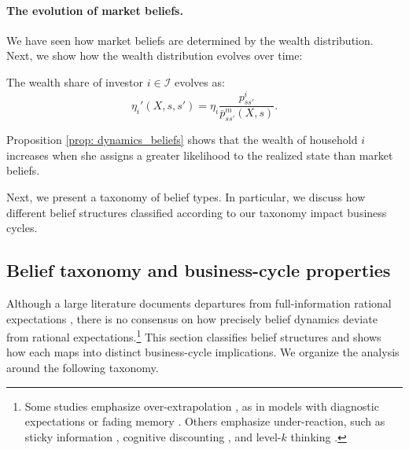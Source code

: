 \paragraph{The evolution of market beliefs.}
We have seen how market beliefs are determined by the wealth distribution. Next, we show how the wealth distribution evolves over time:
\begin{proposition}\label{prop: dynamics_beliefs} 
    The wealth share of investor $i\in \mathcal{I}$ evolves as:
        \begin{equation}
        \eta_i'(X,s,s') = \eta_i \frac{p^i_{ss'}}{\overline{p}^m_{ss'}(X,s)}.
    \end{equation}

\end{proposition}
Proposition \ref{prop: dynamics_beliefs} shows that the wealth of household $i$ increases when she assigns a greater likelihood to the realized state than market beliefs. 

Next, we present a taxonomy of belief types. 
In particular, we discuss how different belief structures classified according to our taxonomy impact business cycles.

\subsection{Belief taxonomy and business-cycle properties}
\label{sec:belief_taxonomy.sec}

Although a large literature documents departures from full-information rational
expectations \citep{greenwood_expectations_2014, coibion2015information}, there is no
consensus on how precisely belief dynamics deviate from rational expectations.\footnote{Some
studies emphasize over-extrapolation \citep{bordalo2020overreaction, fuster2010natural},
as in models with diagnostic expectations \citep{bordalo2018diagnostic} or fading memory
\citep{nagel2022asset}. Others emphasize under-reaction, such as sticky information
\citep{mankiw2010imperfect}, cognitive discounting \citep{gabaix2019behavioral}, and
level-$k$ thinking \citep{farhi2019monetary}.} This section classifies belief structures
and shows how each maps into distinct business-cycle implications. We organize the
analysis around the following taxonomy.

